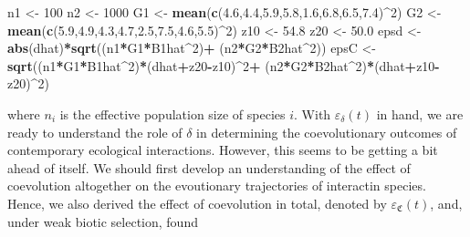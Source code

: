 \documentclass[]{article}
\newenvironment{Shaded}{\begin{snugshade}}{\end{snugshade}}
\newcommand{\DecValTok}[1]{\textcolor[rgb]{0.00,0.00,0.81}{#1}}
\newcommand{\FloatTok}[1]{\textcolor[rgb]{0.00,0.00,0.81}{#1}}
\newcommand{\KeywordTok}[1]{\textcolor[rgb]{0.13,0.29,0.53}{\textbf{#1}}}
\newcommand{\NormalTok}[1]{#1}
\newcommand{\OperatorTok}[1]{\textcolor[rgb]{0.81,0.36,0.00}{\textbf{#1}}}
\newcommand{\StringTok}[1]{\textcolor[rgb]{0.31,0.60,0.02}{#1}}
\begin{document}
\begin{Shaded}
\begin{Highlighting}[]
\NormalTok{n1 <-}\StringTok{ }\DecValTok{100}
\NormalTok{n2 <-}\StringTok{ }\DecValTok{1000}
\NormalTok{G1 <-}\StringTok{ }\KeywordTok{mean}\NormalTok{(}\KeywordTok{c}\NormalTok{(}\FloatTok{4.6}\NormalTok{,}\FloatTok{4.4}\NormalTok{,}\FloatTok{5.9}\NormalTok{,}\FloatTok{5.8}\NormalTok{,}\FloatTok{1.6}\NormalTok{,}\FloatTok{6.8}\NormalTok{,}\FloatTok{6.5}\NormalTok{,}\FloatTok{7.4}\NormalTok{)}\OperatorTok{^}\DecValTok{2}\NormalTok{)}
\NormalTok{G2 <-}\StringTok{ }\KeywordTok{mean}\NormalTok{(}\KeywordTok{c}\NormalTok{(}\FloatTok{5.9}\NormalTok{,}\FloatTok{4.9}\NormalTok{,}\FloatTok{4.3}\NormalTok{,}\FloatTok{4.7}\NormalTok{,}\FloatTok{2.5}\NormalTok{,}\FloatTok{7.5}\NormalTok{,}\FloatTok{4.6}\NormalTok{,}\FloatTok{5.5}\NormalTok{)}\OperatorTok{^}\DecValTok{2}\NormalTok{)}
\NormalTok{z10 <-}\StringTok{ }\FloatTok{54.8}
\NormalTok{z20 <-}\StringTok{ }\FloatTok{50.0}
\NormalTok{epsd <-}\StringTok{ }\KeywordTok{abs}\NormalTok{(dhat)}\OperatorTok{*}\KeywordTok{sqrt}\NormalTok{((n1}\OperatorTok{*}\NormalTok{G1}\OperatorTok{*}\NormalTok{B1hat}\OperatorTok{^}\DecValTok{2}\NormalTok{)}\OperatorTok{+}
\StringTok{                       }\NormalTok{(n2}\OperatorTok{*}\NormalTok{G2}\OperatorTok{*}\NormalTok{B2hat}\OperatorTok{^}\DecValTok{2}\NormalTok{))}
\NormalTok{epsC <-}\StringTok{ }\KeywordTok{sqrt}\NormalTok{((n1}\OperatorTok{*}\NormalTok{G1}\OperatorTok{*}\NormalTok{B1hat}\OperatorTok{^}\DecValTok{2}\NormalTok{)}\OperatorTok{*}\NormalTok{(dhat}\OperatorTok{+}\NormalTok{z20}\OperatorTok{-}\NormalTok{z10)}\OperatorTok{^}\DecValTok{2}\OperatorTok{+}
\StringTok{                       }\NormalTok{(n2}\OperatorTok{*}\NormalTok{G2}\OperatorTok{*}\NormalTok{B2hat}\OperatorTok{^}\DecValTok{2}\NormalTok{)}\OperatorTok{*}\NormalTok{(dhat}\OperatorTok{+}\NormalTok{z10}\OperatorTok{-}\NormalTok{z20)}\OperatorTok{^}\DecValTok{2}\NormalTok{)}
\end{Highlighting}
\end{Shaded}

where \(n_i\) is the effective population size of species \(i\). With
\(\varepsilon_\delta(t)\) in hand, we are ready to understand the role
of \(\delta\) in determining the coevolutionary outcomes of contemporary
ecological interactions. However, this seems to be getting a bit ahead
of itself. We should first develop an understanding of the effect of
coevolution altogether on the evoutionary trajectories of interactin
species. Hence, we also derived the effect of coevolution in total,
denoted by \(\varepsilon_\mathfrak{C}(t)\), and, under weak biotic
selection, found
\end{document}
